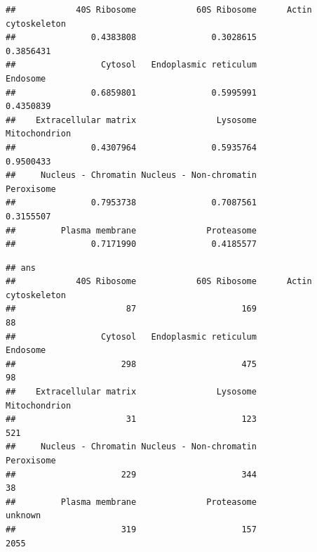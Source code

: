 \begin{knitrout}
\color{fgcolor}\begin{kframe}
\begin{alltt}
 \hlkwb{<-} 
                 \hlstd{=} \hlstd{,}
                 \hlstd{=} \hlstd{,}
                 \hlstd{=} \hlstd{,}
                 \hlstd{=} \hlstd{)}
\end{alltt}
\begin{verbatim}
##            40S Ribosome            60S Ribosome      Actin cytoskeleton 
##               0.4383808               0.3028615               0.3856431 
##                 Cytosol   Endoplasmic reticulum                Endosome 
##               0.6859801               0.5995991               0.4350839 
##    Extracellular matrix                Lysosome           Mitochondrion 
##               0.4307964               0.5935764               0.9500433 
##     Nucleus - Chromatin Nucleus - Non-chromatin              Peroxisome 
##               0.7953738               0.7087561               0.3155507 
##         Plasma membrane              Proteasome 
##               0.7171990               0.4185577
\end{verbatim}
\begin{alltt}
 \hlkwb{<-} 
                      \hlstd{=} \hlstd{,}
                      \hlstd{=} \hlstd{,}
                      \hlstd{=} \hlstd{,}
                      
\end{alltt}
\begin{verbatim}
## ans
##            40S Ribosome            60S Ribosome      Actin cytoskeleton 
##                      87                     169                      88 
##                 Cytosol   Endoplasmic reticulum                Endosome 
##                     298                     475                      98 
##    Extracellular matrix                Lysosome           Mitochondrion 
##                      31                     123                     521 
##     Nucleus - Chromatin Nucleus - Non-chromatin              Peroxisome 
##                     229                     344                      38 
##         Plasma membrane              Proteasome                 unknown 
##                     319                     157                    2055
\end{verbatim}
\end{kframe}
\end{knitrout}

